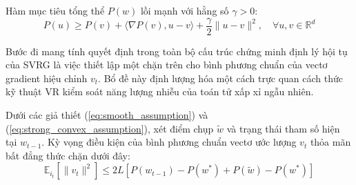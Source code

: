 \begin{assumption}
\label{ass:strong_convex}
Hàm mục tiêu tổng thể $P(w)$ lồi mạnh với hằng số $\gamma > 0$:
\begin{equation}
P(u) \ge P(v) + \langle \nabla P(v), u - v \rangle + \frac{\gamma}{2}\|u - v\|^2, \quad \forall u, v \in \mathbb{R}^d
\end{equation}
\end{assumption}


Bước đi mang tính quyết định trong toàn bộ cấu trúc chứng minh định lý hội tụ của SVRG là việc thiết lập một chặn trên cho bình phương chuẩn của vectơ gradient hiệu chỉnh $v_t$. Bổ đề này định lượng hóa một cách trực quan cách thức kỹ thuật VR kiểm soát năng lượng nhiễu của toán tử xấp xỉ ngẫu nhiên.

\begin{lemma}\label{lem:variance_bound}
Dưới các giả thiết (\ref{eq:smooth_assumption}) và (\ref{eq:strong_convex_assumption}), xét điểm chụp $\tilde{w}$ và trạng thái tham số hiện tại $w_{t-1}$. Kỳ vọng điều kiện của bình phương chuẩn vectơ ước lượng $v_t$ thỏa mãn bất đẳng thức chặn dưới đây:
\begin{equation}\label{eq:variance_lemma_bound}
\mathbb{E}_{i_t} \left[ \|v_t\|^2 \right] \le 2L \left[ P(w_{t-1}) - P(w^*) + P(\tilde{w}) - P(w^*) \right]
\end{equation}
\end{lemma}



